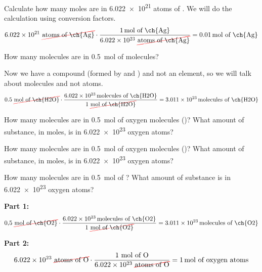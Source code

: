 \begin{example}{}
    Calculate how many moles are in \num{6.022e21} atoms of . We will do the calculation using conversion factors.
    \begin{equation*}
        \num{6.022e21}\ \cancelred{\text{atoms of \ch{Ag}}} \cdot \dfrac{\qty{1}{\mole}\ \text{of \ch{Ag}}}{\num{6.022e23}\ \cancelred{\text{atoms of \ch{Ag}}}} = \qty{0.01}{\mol}\ \text{of \ch{Ag}}
    \end{equation*}
\end{example}

\begin{example}{}
    How many molecules are in \qty{0.5}{\mole} of  molecules?

    Now we have a compound (formed by  and ) and not an element, so we will talk about molecules and not atoms.
    \begin{equation*}
        0.5\ \cancelred{\unit{\mole}\ \text{of \ch{H2O}}} \cdot \dfrac{\qty{6.022e23}{\text{molecules}}\ \text{of \ch{H2O}}}{1\ \cancelred{\unit{\mole} \ \text{of \ch{H2O}}}} = \qty{3.011e23}{\text{molecules}}\ \text{of \ch{H2O}}
    \end{equation*}
\end{example}



\begin{exercise}
    How many molecules are in \qty{0.5}{\mole} of oxygen molecules ()? What amount of substance, in moles, is in \num{6.022e23} oxygen atoms?
    \begin{solu}
        How many molecules are in \qty{0.5}{\mole} of oxygen molecules ()? What amount of substance, in moles, is in \num{6.022e23} oxygen atoms?

        How many molecules are in \qty{0.5}{\mole} of ? What amount of substance is in \num{6.022e23} oxygen atoms?

        \textbf{Part 1:}
        \begin{equation*}
            0{,}5\ \cancelred{\unit{\mole}\ \text{of \ch{O2}}} \cdot \dfrac{\qty{6.022e23}{\text{molecules of \ch{O2}}}}{1\ \cancelred{\unit{\mole}\ \text{of \ch{O2}}}} = \qty{3.011e23}{\text{molecules of \ch{O2}}}
        \end{equation*}

        \textbf{Part 2:}
        \begin{equation*}
            \num{6.022e23}\ \cancelred{\text{atoms of O}} \cdot \dfrac{1\ \unit{\mole}\ \text{of O}}{\num{6.022e23}\ \cancelred{\text{atoms of O}}} = \qty{1}{\mole}\ \text{of oxygen atoms}
        \end{equation*}
    \end{solu}
\end{exercise}

